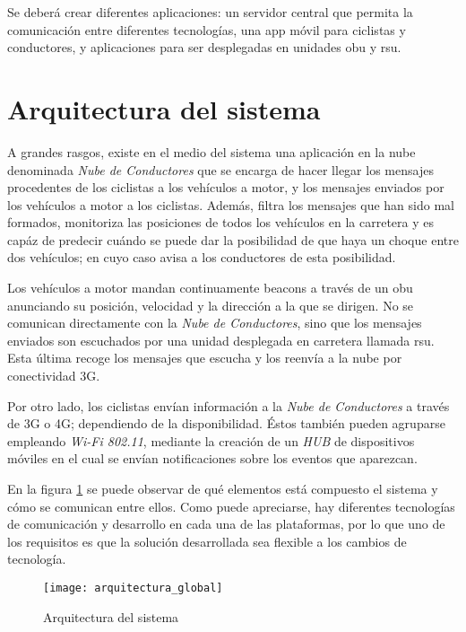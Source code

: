 Se deberá crear diferentes aplicaciones: un servidor central que permita la comunicación entre diferentes tecnologías, una app móvil para ciclistas y conductores, y aplicaciones para ser desplegadas en unidades \gls{obu} y \gls{rsu}.

\section{Arquitectura del sistema}\label{section:arquitecturaSistema}
A grandes rasgos, existe en el medio del sistema una aplicación en la nube denominada \emph{Nube de Conductores} que se encarga de hacer llegar los mensajes procedentes de los ciclistas a los vehículos a motor, y los mensajes enviados por los vehículos a motor a los ciclistas. Además, filtra los mensajes que han sido mal formados, monitoriza las posiciones de todos los vehículos en la carretera y es capáz de predecir cuándo se puede dar la posibilidad de que haya un choque entre dos vehículos; en cuyo caso avisa a los conductores de esta posibilidad.

Los vehículos a motor mandan continuamente beacons a través de un \gls{obu} anunciando su posición, velocidad y la dirección a la que se dirigen. No se comunican directamente con la \emph{Nube de Conductores}, sino que los mensajes enviados son escuchados por una unidad desplegada en carretera llamada \gls{rsu}. Esta última recoge los mensajes que escucha y los reenvía a la nube por conectividad 3G.

Por otro lado, los ciclistas envían información a la \emph{Nube de Conductores} a través de 3G o 4G; dependiendo de la disponibilidad. Éstos también pueden agruparse empleando \emph{Wi-Fi 802.11}, mediante la creación de un \emph{HUB} de dispositivos móviles en el cual se envían notificaciones sobre los eventos que aparezcan.

En la figura \ref{fig:ArquitecturaSistema} se puede observar de qué elementos está compuesto el sistema y cómo se comunican entre ellos. Como puede apreciarse, hay diferentes tecnologías de comunicación y desarrollo en cada una de las plataformas, por lo que uno de los requisitos es que la solución desarrollada sea flexible a los cambios de tecnología.

\begin{figure}[H]
	\begin{center}
		\texttt{[image: arquitectura\_global]}
		\caption{Arquitectura del sistema}
		\label{fig:ArquitecturaSistema}
	 \end{center}
\end{figure}

